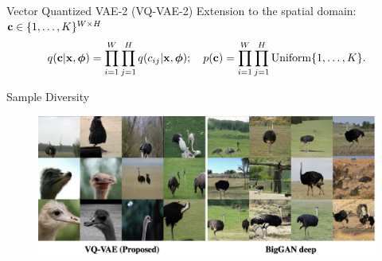 \documentclass{beamer}
\begin{document}
\begin{frame}{Vector Quantized VAE-2 (VQ-VAE-2)}
	Extension to the spatial domain: $\mathbf{c} \in \{1, \dots, K\}^{W \times H}$
	\vspace{-0.3cm}
	\[
		q(\mathbf{c} | \mathbf{x}, \boldsymbol{\phi}) = \prod_{i=1}^W \prod_{j=1}^H q(c_{ij} | \mathbf{x}, \boldsymbol{\phi}); \quad p(\mathbf{c}) = \prod_{i=1}^W \prod_{j=1}^H \text{Uniform}\{1, \dots, K\}.
	\]
	\vspace{-0.6cm}
	\begin{block}{Sample Diversity}
		\vspace{-0.2cm}
		\begin{figure}
			\centering
			\includegraphics[width=1.0\linewidth]{figs/vqvae2_diversity}
		\end{figure}
	\end{block}
\end{frame}
\end{document}
